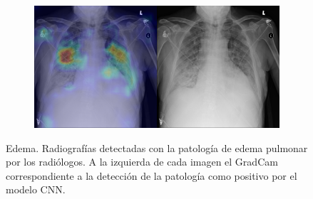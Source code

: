 \begin{figure}[b]
\begin{subfigure}{0.4\textwidth}
    \end{subfigure}
    \begin{subfigure}{0.4\textwidth}
        \centering
        \includegraphics[width=1.0\textwidth]{Chapters/5. Conclusiones/img/Edema/1_1_00011583_006.png}
    \end{subfigure}

    \caption{Edema. Radiografías detectadas con la patología de edema pulmonar por los
                    radiólogos. A la izquierda de cada imagen el GradCam correspondiente a la detección
                    de la patología como positivo por el modelo CNN.}
\end{figure}

